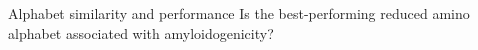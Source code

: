 \documentclass{beamer}\usepackage[]{graphicx}\usepackage[]{color}
\begin{document}



\begin{frame}{Alphabet similarity and performance}
Is the best-performing reduced amino alphabet associated with amyloidogenicity?
\end{frame}
\end{document}
